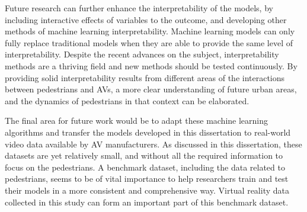 Future research can further enhance the interpretability of the models, by including interactive effects of variables to the outcome, and developing other methods of machine learning interpretability. Machine learning models can only fully replace traditional models when they are able to provide the same level of interpretability. Despite the recent advances on the subject, interpretability methods are a thriving field and new methods should be tested continuously. By providing solid interpretability results from different areas of the interactions between pedestrians and AVs, a more clear understanding of future urban areas, and the dynamics of pedestrians in that context can be elaborated.

The final area for future work would be to adapt these machine learning algorithms and transfer the models developed in this dissertation to real-world video data available by AV manufacturers. As discussed in this dissertation, these datasets are yet relatively small, and without all the required information to focus on the pedestrians. A benchmark dataset, including the data related to pedestrians, seems to be of vital importance to help researchers train and test their models in a more consistent and comprehensive way. Virtual reality data collected in this study can form an important part of this benchmark dataset. 


